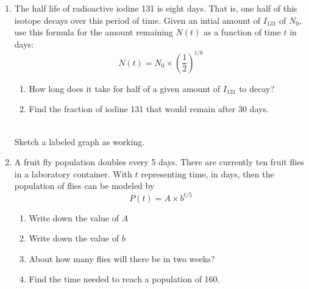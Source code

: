 \documentclass[12pt, twoside]{article}
\begin{document}
\begin{enumerate}
\item The half life of radioactive iodine 131 is eight days. That is, one half of this isotope decays over this period of time. Given an intial amount of $I_{131}$ of $N_0$, use this formula for the amount remaining $N(t)$ as a function of time $t$ in days: \[\displaystyle N(t)=N_0 \times \left( \frac{1}{2} \right)^{t/8}\]  \vspace{0.25cm}
    \begin{multicols}{2}
        \begin{enumerate}[itemsep=1.5cm]
            \item How long does it take for half of a given amount of $I_{131}$ to decay?
            \item Find the fraction of iodine 131 that would remain after 30 days. \vspace{0.75cm}
        \end{enumerate} \vspace{0.5cm}
        \begin{flushright}
        \\[0.5cm]
        Sketch a labeled graph as working.
        \end{flushright}
        
    \end{multicols}

\newpage
\item A fruit fly population doubles every 5 days. There are currently ten fruit flies in a laboratory container. With $t$ representing time, in days, then the population of flies can be modeled by \[\displaystyle P(t)=A \times b^{t/5}\]
    \begin{enumerate}[itemsep=0.75cm]
        \item Write down the value of $A$
        \item Write down the value of $b$
        \item About how many flies will there be in two weeks? \vspace{1.5cm}
        \item Find the time needed to reach a population of 160.
    \end{enumerate} \vspace{1.5cm}
    

\end{enumerate}
\end{document}
